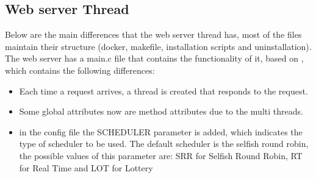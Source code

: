 \documentclass{article}
\begin{document}
\subsection{Web server Thread}
Below are the main differences that the web server thread has, most of the files maintain their structure (docker, makefile, installation scripts and uninstallation).
The web server has a main.c file that contains the functionality of it, based on \cite{Server}, which contains the following differences:
\begin{itemize}
    \item Each time a request arrives, a thread is created that responds to the request.
    \item Some global attributes now are method attributes due to the multi threads. 
    \item in the config file the SCHEDULER parameter is added, which indicates the type of scheduler to be used. The default scheduler is the selfish round robin, the possible values of this parameter are: SRR for Selfish Round Robin, RT for Real Time and LOT for Lottery
\end{itemize}
\end{document}
